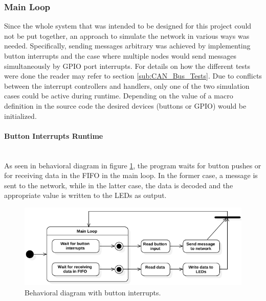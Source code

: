 \subsubsection{Main Loop}
Since the whole system that was intended to be designed for this project could not be put together, an approach to simulate the network in various ways was needed.
Specifically, sending messages arbitrary was achieved by implementing button interrupts and the case where multiple nodes would send messages simultaneously by GPIO port interrupts.
For details on how the different tests were done the reader may refer to section \ref{sub:CAN_Bus_Tests}.
Due to conflicts between the interrupt controllers and handlers, only one of the two simulation cases could be active during runtime.
Depending on the value of a macro definition in the source code the desired devices (buttons or GPIO) would be initialized.

\paragraph{Button Interrupts Runtime}~\\
As seen in behavioral diagram in figure \ref{fig:StateDiagram_CANSoft_BtnsIntr}, the program waits for button pushes or for receiving data in the FIFO in the main loop. In the former case, a message is sent to the network, while in the latter case, the data is decoded and the appropriate value is written to the LEDs as output.
\begin{figure}[h!]
	\centering
	\includegraphics[width = 1\linewidth]{graphics/StateDiagram_CANSoft_BtnsIntr.pdf}
	\caption{Behavioral diagram with button interrupts.}
	\label{fig:StateDiagram_CANSoft_BtnsIntr}
\end{figure}

